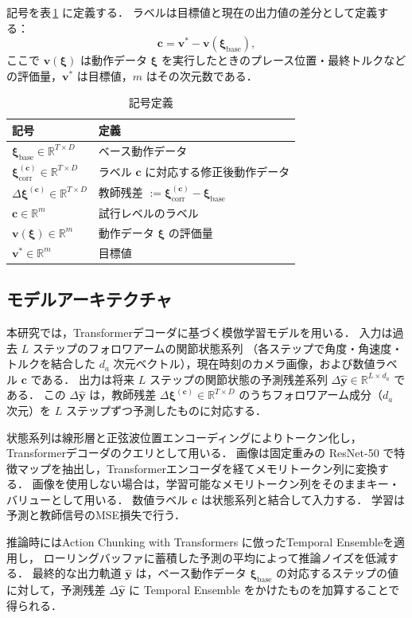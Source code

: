 記号を表\,\ref{tab:notation} に定義する．
ラベルは目標値と現在の出力値の差分として定義する：
\begin{equation}
  \bm{c} = \bm{v}^* - \bm{v}(\bm{\xi}_\text{base}),
  \label{eq:label}
\end{equation}
ここで $\bm{v}(\bm{\xi})$ は動作データ $\bm{\xi}$ を実行したときのプレース位置・最終トルクなどの評価量，$\bm{v}^*$ は目標値，$m$ はその次元数である．

\begin{table}[t]
  \centering
  \caption{記号定義}
  \label{tab:notation}
  \small
  \begin{tabular}{ll}
    \hline
    記号 & 定義 \\
    \hline
    $\bm{\xi}_\text{base} \in \mathbb{R}^{T \times D}$ & ベース動作データ \\
    $\bm{\xi}^{(\bm{c})}_\text{corr} \in \mathbb{R}^{T \times D}$ & ラベル $\bm{c}$ に対応する修正後動作データ \\
    $\Delta\bm{\xi}^{(\bm{c})} \in \mathbb{R}^{T \times D}$ & 教師残差 $:= \bm{\xi}^{(\bm{c})}_\text{corr} - \bm{\xi}_\text{base}$ \\
    $\bm{c} \in \mathbb{R}^m$ & 試行レベルのラベル \\
    $\bm{v}(\bm{\xi}) \in \mathbb{R}^m$ & 動作データ $\bm{\xi}$ の評価量 \\
    $\bm{v}^* \in \mathbb{R}^m$ & 目標値 \\
    \hline
  \end{tabular}
\end{table}

\subsection{モデルアーキテクチャ}

本研究では，Transformerデコーダに基づく模倣学習モデルを用いる．
入力は過去 $L$ ステップのフォロワアームの関節状態系列
（各ステップで角度・角速度・トルクを結合した $d_a$ 次元ベクトル），現在時刻のカメラ画像，および数値ラベル $\bm{c}$ である．
出力は将来 $L$ ステップの関節状態の予測残差系列 $\Delta\hat{\bm{y}} \in \mathbb{R}^{L \times d_a}$ である．
この $\Delta\hat{\bm{y}}$ は，教師残差 $\Delta\bm{\xi}^{(\bm{c})} \in \mathbb{R}^{T \times D}$ のうちフォロワアーム成分（$d_a$ 次元）を $L$ ステップずつ予測したものに対応する．

状態系列は線形層と正弦波位置エンコーディングによりトークン化し，Transformerデコーダのクエリとして用いる．
画像は固定重みの ResNet-50 \cite{he2016resnet}で特徴マップを抽出し，Transformerエンコーダを経てメモリトークン列に変換する．
画像を使用しない場合は，学習可能なメモリトークン列をそのままキー・バリューとして用いる．
数値ラベル $\bm{c}$ は状態系列と結合して入力する．
学習は予測と教師信号のMSE損失で行う．

推論時にはAction Chunking with Transformers \cite{Zhao2023ACT} に倣ったTemporal Ensembleを適用し，
ローリングバッファに蓄積した予測の平均によって推論ノイズを低減する．
最終的な出力軌道 $\hat{\bm{y}}$ は，ベース動作データ $\bm{\xi}_\text{base}$ の対応するステップの値に対して，予測残差 $\Delta\hat{\bm{y}}$ に Temporal Ensemble をかけたものを加算することで得られる．